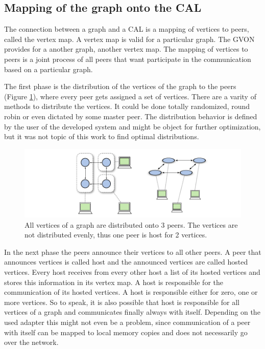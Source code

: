\subsection{Mapping of the graph onto the CAL}
\label{sec:mapping}
The connection between a graph and a CAL is a mapping of vertices to
peers, called the vertex map.  A vertex map is valid for a particular
graph. The GVON provides for a another graph, another vertex map.  The
mapping of vertices to peers is a joint process of all peers that want
participate in the communication based on a particular graph.

The first phase is the distribution of the vertices of the graph to
the peers (Figure \ref{fig:gvon_mapping}), where every peer gets
assigned a set of vertices. There are a varity of methods to
distribute the vertices.  It could be done totally randomized, round
robin or even dictated by some master peer. The distribution behavior
is defined by the user of the developed system and might be object for
further optimization, but it was not topic of this work to find optimal
distributions.

\begin{figure}[H]
  \centering \includegraphics[width=\textwidth]{graphics/30_gon_mapping}
  \caption{All vertices of a graph are distributed onto 3 peers. The vertices
  are not distributed evenly, thus one peer is host for 2 vertices.}
  \label{fig:gvon_mapping}
\end{figure}

In the next phase the peers announce their vertices to all other
peers.  A peer that announces vertices is called host and the
announced vertices are called hosted vertices.  Every host receives
from every other host a list of its hosted vertices and stores this
information in its vertex map. A host is responsible for the
communication of its hosted vertices. A host is responsible either for
zero, one or more vertices. So to speak, it is also possible that host
is responsible for all vertices of a graph and communicates finally
always with itself.  Depending on the used adapter this might not even
be a problem, since communication of a peer with itself can be mapped
to local memory copies and does not necessarily go over the network.

